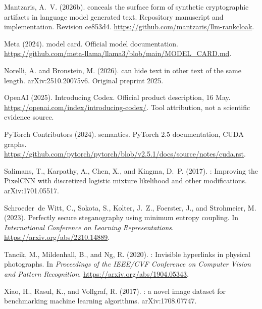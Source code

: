 \documentclass[a4paper,twoside]{article}
\begin{document}
{\begin{thebibliography}{}
Mantzaris, A.~V. (2026b).
 conceals the surface form of synthetic cryptographic
  artifacts in language model generated text.
\newblock Repository manuscript and implementation.
\newblock Revision ce853d4. \url{https://github.com/mantzaris/llm-rankcloak}.

{Meta} (2024).
 model card.
\newblock Official model documentation.
\newblock \url{https://github.com/meta-llama/llama3/blob/main/MODEL_CARD.md}.

Norelli, A. and Bronstein, M. (2026).
 can hide text in other text of the same length.
\newblock arXiv:2510.20075v6.
\newblock Original preprint 2025.

{OpenAI} (2025).
\newblock Introducing {Codex}.
\newblock Official product description, 16 May.
\newblock \url{https://openai.com/index/introducing-codex/}. Tool attribution,
  not a scientific evidence source.

{PyTorch Contributors} (2024).
 semantics.
\newblock PyTorch 2.5 documentation, CUDA graphs.
\newblock
  \url{https://github.com/pytorch/pytorch/blob/v2.5.1/docs/source/notes/cuda.rst}.

Salimans, T., Karpathy, A., Chen, X., and Kingma, D.~P. (2017).
: Improving the {PixelCNN} with discretized logistic
  mixture likelihood and other modifications.
\newblock arXiv:1701.05517.

Schroeder~de Witt, C., Sokota, S., Kolter, J.~Z., Foerster, J., and Strohmeier,
  M. (2023).
\newblock Perfectly secure steganography using minimum entropy coupling.
\newblock In {\em International Conference on Learning Representations}.
\newblock \url{https://arxiv.org/abs/2210.14889}.

Tancik, M., Mildenhall, B., and Ng, R. (2020).
: Invisible hyperlinks in physical photographs.
\newblock In {\em Proceedings of the IEEE/CVF Conference on Computer Vision and
  Pattern Recognition}.
\newblock \url{https://arxiv.org/abs/1904.05343}.

Xiao, H., Rasul, K., and Vollgraf, R. (2017).
: a novel image dataset for benchmarking machine
  learning algorithms.
\newblock arXiv:1708.07747.


\end{thebibliography}}
\end{document}
